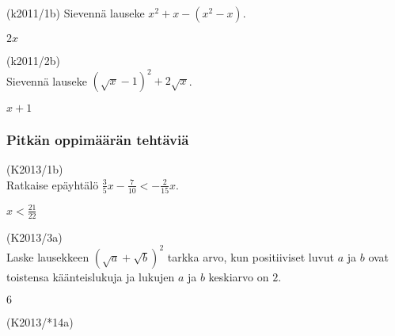
\begin{tehtava}
(k2011/1b) Sievennä lauseke $x^2+x-(x^2-x)$.
\begin{vastaus}
$2x$
\end{vastaus}
\end{tehtava}

\begin{tehtava}
(k2011/2b) \\ Sievennä lauseke $(\sqrt{x}-1)^2+2\sqrt{x}$.
\begin{vastaus}
$x+1$
\end{vastaus}
\end{tehtava}


\subsubsection*{Pitkän oppimäärän tehtäviä}


\begin{tehtava}
(K2013/1b) \\ Ratkaise epäyhtälö $\frac{3}{5}x-\frac{7}{10} < -\frac{2}{15}x$.
\begin{vastaus}
$x<\frac{21}{22}$
\end{vastaus}
\end{tehtava}

\begin{tehtava}
(K2013/3a) \\ Laske lausekkeen $(\sqrt{a}+\sqrt{b})^2$ tarkka arvo, kun positiiviset luvut $a$ ja $b$ ovat toistensa käänteislukuja ja lukujen $a$ ja $b$ keskiarvo on $2$.
\begin{vastaus}
$6$
\end{vastaus}
\end{tehtava}

\begin{tehtava}
(K2013/*14a) \\
	\begin{alakohdat}
	\end{alakohdat}
\begin{vastaus}
\begin{alakohdat}
	\alakohta{$(x+2)(x-1)$}
	\alakohta{$A= \frac{1}{3}$ ja $B=- \frac{1}{3}$}
	\end{alakohdat}
\end{vastaus}
\end{tehtava}


